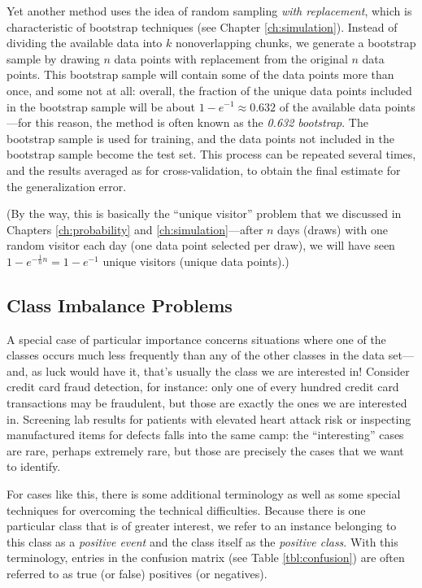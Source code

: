 Yet another method uses the idea of random sampling \emph{with
  replacement}, which is characteristic of bootstrap techniques (see
Chapter \ref{ch:simulation}). Instead of dividing the available data
into $k$ nonoverlapping chunks, we generate a bootstrap sample by
drawing $n$ data points with replacement from the\vadjust{} original $n$ data
points. This bootstrap sample will contain some of the data points
more than once,  and some not at all: overall, the fraction of the
unique data points included in the bootstrap sample will be about
$1-e^{-1} \approx 0.632$ of the available data points---for this
reason, the method is often known as the \emph{0.632 bootstrap}.  The
bootstrap sample is used for training, and the data points not
included in the bootstrap sample become the test set. This process can
be repeated several times, and the results averaged as for
cross-validation, to obtain the final estimate for the generalization
error.

(By the way, this is basically the ``unique visitor'' problem that we
discussed in Chapters \ref{ch:probability} and
\ref{ch:simulation}---after $n$ days (draws) with one random visitor
each day (one data point selected per draw), we will have seen
$1-e^{-\frac{1}{n}n} = 1-e^{-1}$ unique visitors (unique data points).)


\subsection{Class Imbalance Problems}


A special case of particular importance concerns situations where one
of the classes occurs much less frequently than any of the other
classes in the data set---and, as luck would have it, that's usually
the class we are interested in! Consider credit card fraud detection,
for instance: only one of every hundred credit card transactions may
be fraudulent, but those are exactly the ones we are interested in.
Screening lab results for patients with elevated heart attack risk or
inspecting manufactured items for defects falls into the same camp:
the ``interesting'' cases are rare, perhaps extremely rare, but those
are precisely the cases that we want to identify.

For cases like this, there is some additional terminology as well as
some special techniques for overcoming the technical difficulties.
Because there is one particular class that is of greater interest, we
refer to an instance belonging to this class as a \emph{positive
  event} and the class itself as the \emph{positive class}. With this
terminology, entries in the confusion matrix (see Table
\ref{tbl:confusion}) are often referred to as true (or false)
positives (or negatives).


